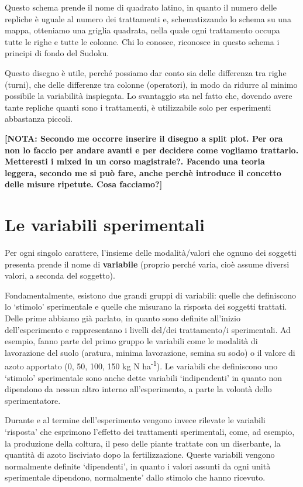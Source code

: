 \documentclass[a4paper,12pt,oneside]{book}
\begin{document}
Questo schema prende il nome di quadrato latino, in quanto il numero delle repliche è uguale al numero dei trattamenti e, schematizzando lo schema su una mappa, otteniamo una griglia quadrata, nella quale ogni trattamento occupa tutte le righe e tutte le colonne. Chi lo conosce, riconosce in questo schema i principi di fondo del Sudoku.

Questo disegno è utile, perché possiamo dar conto sia delle differenza tra righe (turni), che delle differenze tra colonne (operatori), in modo da ridurre al minimo possibile la variabilità inspiegata. Lo svantaggio sta nel fatto che, dovendo avere tante repliche quanti sono i trattamenti, è utilizzabile solo per esperimenti abbastanza piccoli.

\textbf{{[}NOTA: Secondo me occorre inserire il disegno a split plot. Per ora non lo faccio per andare avanti e per decidere come vogliamo trattarlo. Metteresti i mixed in un corso magistrale?. Facendo una teoria leggera, secondo me si può fare, anche perchè introduce il concetto delle misure ripetute. Cosa facciamo?{]}}

\hypertarget{le-variabili-sperimentali}{%
\section{Le variabili sperimentali}\label{le-variabili-sperimentali}}

Per ogni singolo carattere, l'insieme delle modalità/valori che ognuno dei soggetti presenta prende il nome di \textbf{variabile} (proprio perché varia, cioè assume diversi valori, a seconda del soggetto).

Fondamentalmente, esistono due grandi gruppi di variabili: quelle che definiscono lo `stimolo' sperimentale e quelle che misurano la risposta dei soggetti trattati. Delle prime abbiamo già parlato, in quanto sono definite all'inizio dell'esperimento e rappresentano i livelli del/dei trattamento/i sperimentali. Ad esempio, fanno parte del primo gruppo le variabili come le modalità di lavorazione del suolo (aratura, minima lavorazione, semina su sodo) o il valore di azoto apportato (0, 50, 100, 150 kg N ha\textsuperscript{-1}). Le variabili che definiscono uno `stimolo' sperimentale sono anche dette variabili `indipendenti' in quanto non dipendono da nessun altro interno all'esperimento, a parte la volontà dello sperimentatore.

Durante e al termine dell'esperimento vengono invece rilevate le variabili `risposta' che esprimono l'effetto dei trattamenti sperimentali, come, ad esempio, la produzione della coltura, il peso delle piante trattate con un diserbante, la quantità di azoto lisciviato dopo la fertilizzazione. Queste variabili vengono normalmente definite `dipendenti', in quanto i valori assunti da ogni unità sperimentale dipendono, normalmente' dallo stimolo che hanno ricevuto.
\end{document}
